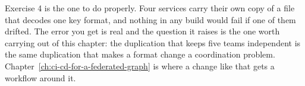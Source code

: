 Exercise 4 is the one to do properly. Four services carry their own copy of a
file that decodes one key format, and nothing in any build would fail if one of
them drifted. The error you get is real and the question it raises is the one
worth carrying out of this chapter: the duplication that keeps five teams
independent is the same duplication that makes a format change a coordination
problem. Chapter~\ref{ch:ci-cd-for-a-federated-graph} is where a change like
that gets a workflow around it.
